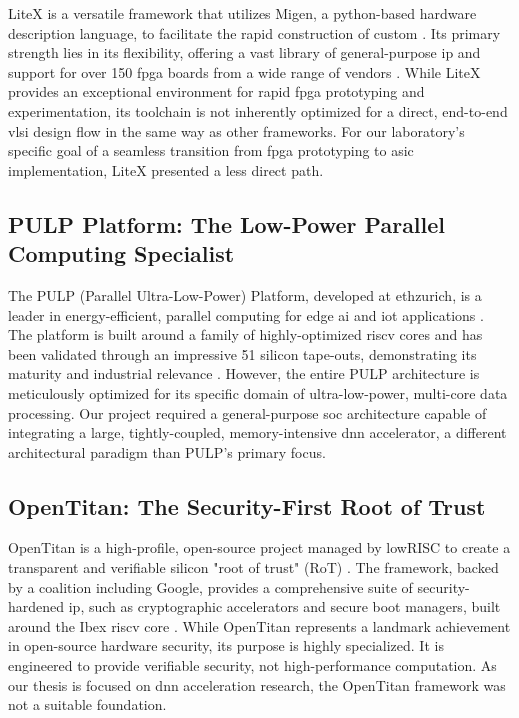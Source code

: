 LiteX is a versatile framework that utilizes Migen, a \acrshort{python}-based hardware description language, to facilitate the rapid construction of custom  \cite{litex_github,litex_paper}. Its primary strength lies in its flexibility, offering a vast library of general-purpose \acrshort{ip} and support for over 150 \acrshort{fpga} boards from a wide range of vendors \cite{litex_boards_repo}. While LiteX provides an exceptional environment for rapid \acrshort{fpga} prototyping and experimentation, its toolchain is not inherently optimized for a direct, end-to-end \acrshort{vlsi} design flow in the same way as other frameworks. For our laboratory's specific goal of a seamless transition from \acrshort{fpga} prototyping to \acrshort{asic} implementation, LiteX presented a less direct path.

\subsection{PULP Platform: The Low-Power Parallel Computing Specialist}

The PULP (Parallel Ultra-Low-Power) Platform, developed at \acrshort{ethzurich}, is a leader in energy-efficient, parallel computing for edge \acrshort{ai} and \acrshort{iot} applications \cite{pulp_platform_org}. The platform is built around a family of highly-optimized \acrshort{riscv} cores and has been validated through an impressive 51 silicon tape-outs, demonstrating its maturity and industrial relevance \cite{pulp_implementation}. However, the entire PULP architecture is meticulously optimized for its specific domain of ultra-low-power, multi-core data processing. Our project required a general-purpose \acrshort{soc} architecture capable of integrating a large, tightly-coupled, memory-intensive \acrshort{dnn} accelerator, a different architectural paradigm than PULP's primary focus.

\subsection{OpenTitan: The Security-First Root of Trust}

OpenTitan is a high-profile, open-source project managed by lowRISC to create a transparent and verifiable silicon "root of trust" (RoT) \cite{opentitan_org}. The framework, backed by a coalition including Google, provides a comprehensive suite of security-hardened \acrshort{ip}, such as cryptographic accelerators and secure boot managers, built around the Ibex \acrshort{riscv} core \cite{opentitan_github}. While OpenTitan represents a landmark achievement in open-source hardware security, its purpose is highly specialized. It is engineered to provide verifiable security, not high-performance computation. As our thesis is focused on \acrshort{dnn} acceleration research, the OpenTitan framework was not a suitable foundation.

